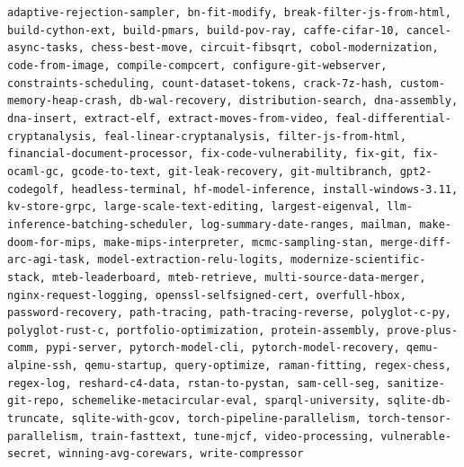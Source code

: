 {\scriptsize\texttt{adaptive-rejection-sampler, bn-fit-modify, break-filter-js-from-html, build-cython-ext, build-pmars, build-pov-ray, caffe-cifar-10, cancel-async-tasks, chess-best-move, circuit-fibsqrt, cobol-modernization, code-from-image, compile-compcert, configure-git-webserver, constraints-scheduling, count-dataset-tokens, crack-7z-hash, custom-memory-heap-crash, db-wal-recovery, distribution-search, dna-assembly, dna-insert, extract-elf, extract-moves-from-video, feal-differential-cryptanalysis, feal-linear-cryptanalysis, filter-js-from-html, financial-document-processor, fix-code-vulnerability, fix-git, fix-ocaml-gc, gcode-to-text, git-leak-recovery, git-multibranch, gpt2-codegolf, headless-terminal, hf-model-inference, install-windows-3.11, kv-store-grpc, large-scale-text-editing, largest-eigenval, llm-inference-batching-scheduler, log-summary-date-ranges, mailman, make-doom-for-mips, make-mips-interpreter, mcmc-sampling-stan, merge-diff-arc-agi-task, model-extraction-relu-logits, modernize-scientific-stack, mteb-leaderboard, mteb-retrieve, multi-source-data-merger, nginx-request-logging, openssl-selfsigned-cert, overfull-hbox, password-recovery, path-tracing, path-tracing-reverse, polyglot-c-py, polyglot-rust-c, portfolio-optimization, protein-assembly, prove-plus-comm, pypi-server, pytorch-model-cli, pytorch-model-recovery, qemu-alpine-ssh, qemu-startup, query-optimize, raman-fitting, regex-chess, regex-log, reshard-c4-data, rstan-to-pystan, sam-cell-seg, sanitize-git-repo, schemelike-metacircular-eval, sparql-university, sqlite-db-truncate, sqlite-with-gcov, torch-pipeline-parallelism, torch-tensor-parallelism, train-fasttext, tune-mjcf, video-processing, vulnerable-secret, winning-avg-corewars, write-compressor}}

